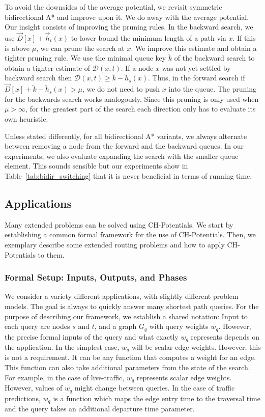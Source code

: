 \documentclass[manuscript,review]{acmart}
\newcommand*{\dist}{\mathcal{D}}
\begin{document}
To avoid the downsides of the average potential, we revisit symmetric bidirectional A* and improve upon it.
We do away with the average potential.
Our insight consists of improving the pruning rules.
In the backward search, we use $\overrightarrow{D}[x] + \overrightarrow{h}_t(x)$ to lower bound the minimum length of a path via $x$.
If this is above $\mu$, we can prune the search at $x$.
We improve this estimate and obtain a tighter pruning rule.
We use the minimal queue key $\overleftarrow{k}$ of the backward search to obtain a tighter estimate of $\dist(x,t)$.
If a node $x$ was not yet settled by backward search then $\dist(x,t) \geq \overleftarrow{k} - \overleftarrow{h}_s(x)$.
Thus, in the forward search if $\overrightarrow{D}[x] + \overleftarrow{k} - \overleftarrow{h}_s(x) > \mu$, we do not need to push $x$ into the queue.
The pruning for the backwards search works analogously.
Since this pruning is only used when $\mu > \infty$, for the greatest part of the search each direction only has to evaluate its own heuristic.

Unless stated differently, for all bidirectional A* variants, we always alternate between removing a node from the forward and the backward queues.
In our experiments, we also evaluate expanding the search with the smaller queue element.
This sounds sensible but our experiments show in Table~\ref{tab:bidir_switching} that it is never beneficial in terms of running time.

\subsection{Applications}\label{sec:extensions}

Many extended problems can be solved using CH-Potentials.
We start by establishing a common formal framework for the use of CH-Potentials.
Then, we exemplary describe some extended routing problems and how to apply CH-Potentials to them.

\subsubsection{Formal Setup: Inputs, Outputs, and Phases}

We consider a variety different applications, with slightly different problem models.
The goal is always to quickly answer many shortest path queries.
For the purpose of describing our framework, we establish a shared notation:
Input to each query are nodes $s$ and $t$, and a graph $G_q$ with query weights $w_q$.
However, the precise formal inputs of the query and what exactly $w_q$ represents depends on the application.
In the simplest case, $w_q$ will be scalar edge weights.
However, this is not a requirement.
It can be any function that computes a weight for an edge.
This function can also take additional parameters from the state of the search.
For example, in the case of live-traffic, $w_q$ represents scalar edge weights.
However, values of $w_q$ might change between queries.
In the case of traffic predictions, $w_q$ is a function which maps the edge entry time to the traversal time and the query takes an additional departure time parameter.
\end{document}
